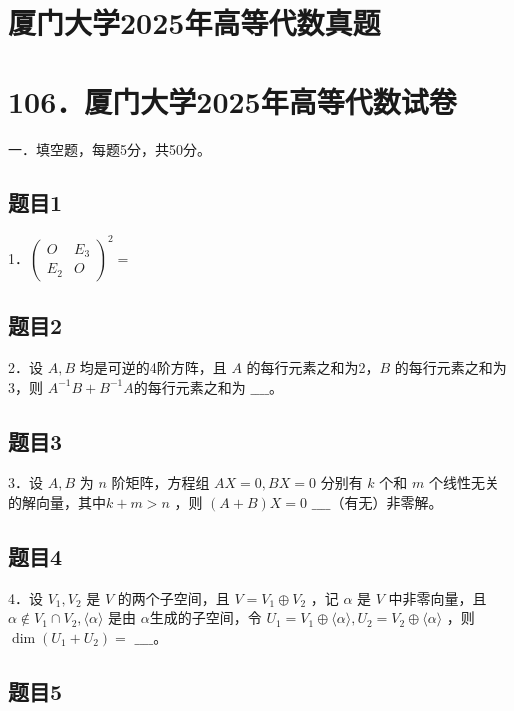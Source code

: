 \documentclass{article}
\begin{document}
\section*{厦门大学2025年高等代数真题}
\section*{106．厦门大学2025年高等代数试卷}
一．填空题，每题5分，共50分。\\

\subsection{题目1}
1．\(\left(\begin{array}{cc}O & E_{3} \\ E_{2} & O\end{array}\right)^{2}=\)

\subsection{题目2}
2．设 \(A, B\) 均是可逆的4阶方阵，且 \(A\) 的每行元素之和为2，\(B\) 的每行元素之和为3，则 \(A^{-1} B+B^{-1} A\)的每行元素之和为 \(\_\_\_\_\)。

\subsection{题目3}
3．设 \(A, B\) 为 \(n\) 阶矩阵，方程组 \(A X=0, B X=0\) 分别有 \(k\) 个和 \(m\) 个线性无关的解向量，其中\(k+m>n\) ，则 \((A+B) X=0\) \(\_\_\_\_\)（有无）非零解。

\subsection{题目4}
4．设 \(V_{1}, V_{2}\) 是 \(V\) 的两个子空间，且 \(V=V_{1} \oplus V_{2}\) ，记 \(\alpha\) 是 \(V\) 中非零向量，且 \(\alpha \notin V_{1} \cap V_{2},\langle\alpha\rangle\) 是由 \(\alpha\)生成的子空间，令 \(U_{1}=V_{1} \oplus\langle\alpha\rangle, U_{2}=V_{2} \oplus\langle\alpha\rangle\) ，则 \(\operatorname{dim}\left(U_{1}+U_{2}\right)=\) \(\_\_\_\_\)。

\begin{itemize}

\subsection{题目5}
\end{itemize}
\end{document}
